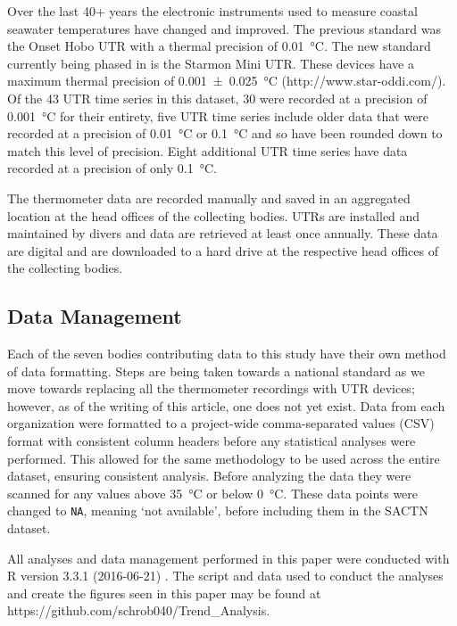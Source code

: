 \documentclass[twocol]{ametsoc}
\begin{document}
Over the last 40+ years the electronic instruments used to measure coastal seawater temperatures have changed and improved. The previous standard was the Onset Hobo UTR with a thermal precision of \SI{0.01}{\degreeCelsius}. The new standard currently being phased in is the Starmon Mini UTR. These devices have a maximum thermal precision of \SI[separate-uncertainty = true, multi-part-units = repeat]{0.001(25)}{\degreeCelsius} (http://www.star-oddi.com/). Of the 43 UTR time series in this dataset, 30 were recorded at a precision of \SI{0.001}{\degreeCelsius} for their entirety, five UTR time series include older data that were recorded at a precision of \SI{0.01}{\degreeCelsius} or \SI{0.1}{\degreeCelsius} and so have been rounded down to match this level of precision. Eight additional UTR time series have data recorded at a precision of only \SI{0.1}{\degreeCelsius}.

The thermometer data are recorded manually and saved in an aggregated location at the head offices of the collecting bodies. UTRs are installed and maintained by divers and data are retrieved at least once annually. These data are digital and are downloaded to a hard drive at the respective head offices of the collecting bodies.

\subsection{Data Management}
Each of the seven bodies contributing data to this study have their own method of data formatting. Steps are being taken towards a national standard as we move towards replacing all the thermometer recordings with UTR devices; however, as of the writing of this article, one does not yet exist. Data from each organization were formatted to a project-wide comma-separated values (CSV) format with consistent column headers before any statistical analyses were performed. This allowed for the same methodology to be used across the entire dataset, ensuring consistent analysis. Before analyzing the data they were scanned for any values above \SI{35}{\degreeCelsius} or below \SI{0}{\degreeCelsius}. These data points were changed to \texttt{NA}, meaning `not available', before including them in the SACTN dataset.

All analyses and data management performed in this paper were conducted with R version 3.3.1 (2016-06-21) \citep{R}. The script and data used to conduct the analyses and create the figures seen in this paper may be found at https://github.com/schrob040/Trend\_Analysis.
\end{document}
